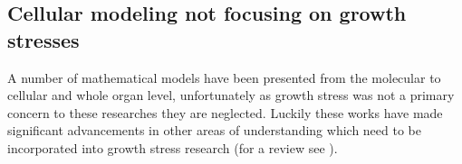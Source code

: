 \subsection{Cellular modeling not focusing on growth stresses}
A number of mathematical models have been presented from the
molecular to cellular and whole organ level, unfortunately as
growth stress was not a primary concern to these researches they are neglected.
Luckily these works have made significant advancements in other areas of
understanding which need to be incorporated into growth stress research (for a review see \cite{ISI:000261731700022}).
